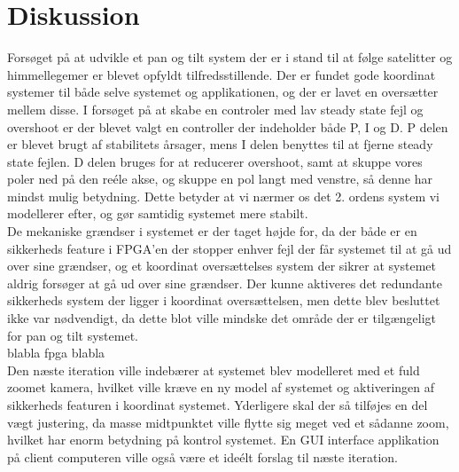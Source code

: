 \section{Diskussion}

Forsøget på at udvikle et pan og tilt system der er i stand til at følge satelitter og himmellegemer er blevet opfyldt tilfredsstillende. Der er fundet gode koordinat systemer til både selve systemet og applikationen, og der er lavet en oversætter mellem disse. I forsøget på at skabe en controler med lav steady state fejl og overshoot er der blevet valgt en controller der indeholder både P, I og D. P delen er blevet brugt af stabilitets årsager, mens I delen benyttes til at fjerne steady state fejlen. D delen bruges for at reducerer overshoot, samt at skuppe vores poler ned på den reéle akse, og skuppe en pol langt med venstre, så denne har mindst mulig betydning. Dette betyder at vi nærmer os det 2. ordens system vi modellerer efter, og gør samtidig systemet mere stabilt.
\\
De mekaniske grændser i systemet er der taget højde for, da der både er en sikkerheds feature i FPGA'en der stopper enhver fejl der får systemet til at gå ud over sine grændser, og et koordinat oversættelses system der sikrer at systemet aldrig forsøger at gå ud over sine grændser. Der kunne aktiveres det redundante sikkerheds system der ligger i koordinat oversættelsen, men dette blev besluttet ikke var nødvendigt, da dette blot ville mindske det område der er tilgængeligt for pan og tilt systemet.
\\
blabla fpga blabla
\\
Den næste iteration ville indebærer at systemet blev modelleret med et fuld zoomet kamera, hvilket ville kræve en ny model af systemet og aktiveringen af sikkerheds featuren i koordinat systemet. Yderligere skal der så tilføjes en del vægt justering, da masse midtpunktet ville flytte sig meget ved et sådanne zoom, hvilket har enorm betydning på kontrol systemet. En GUI interface applikation på client computeren ville også være et ideélt forslag til næste iteration.





